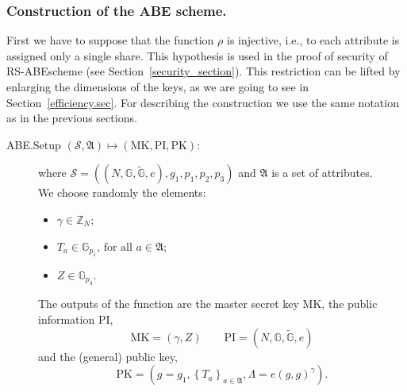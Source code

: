 \documentclass[a4paper,10pt]{article}
\newcommand{\G}{\mathbb{G}}
\newcommand{\GT}{\widetilde{\G}} \newcommand{\N}{\mathbb{N}}
\newcommand{\Z}{\mathbb{Z}}
\newcommand{\maps}[2]{$ \left( #1 \right) \mapsto \left( #2 \right) $}
\newcommand{\algorithmdef}[4]{\item[#1.#2 \maps{#3}{#4}:]}
\begin{document}
\subsubsection{Construction of the ABE scheme.}\label{ABE.construction}
First we have to suppose that the function $\rho$ is injective, i.e., to each attribute is assigned only a single share. This hypothesis is used in the proof of security of  RS-ABE\@ scheme (see Section~\ref{security_section}). This restriction can be lifted by enlarging the dimensions of the keys, as we are going to see in Section~\ref{efficiency.sec}. For describing the construction we use the same notation as in the previous sections.
\begin{description}
		\algorithmdef{ABE}{Setup}{\mathscr{S},\mathfrak{A}}{\mathrm{MK},\mathrm{PI},\mathrm{PK}} where  $\mathscr{S}=((N, \G, \GT, e), g_1,p_1,p_2,p_3)$ and  $\mathfrak{A}$ is a set of attributes.\\ We choose randomly the elements:\begin{itemize}
		\item $\gamma \in \Z_N$;
		\item $T_a\in \G_{p_1}\text{, for all }a\in \mathfrak{A}$;
		\item $Z\in\G_{p_3}$.
	\end{itemize}
The outputs of the function are the master secret key $\mathrm{MK}$, the public information $\mathrm{PI}$,
	\[
		\mathrm{MK}=\left( \gamma, Z \right) \qquad \mathrm{PI}= \left(N,\G,\GT,e\right)
	\]
	and the (general) public key,
	\[
		\mathrm{PK}=\left( g=g_1, \left\{T_a\right\}_{a\in \mathfrak{A}}, \Lambda=e(g,g)^\gamma \right).
	\]
	

\end{description}
\end{document}
